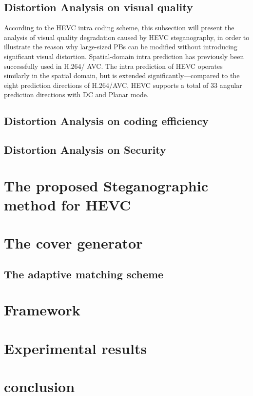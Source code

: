 \documentclass[journal,sort]{IEEEtran}
\begin{document}
\subsection{Distortion Analysis on visual quality}
According to the HEVC intra coding scheme, this subsection will present the analysis of visual quality degradation caused by HEVC steganography, in order to illustrate the reason why large-sized PBs can be modified without introducing significant visual distortion.
Spatial-domain intra prediction has previously been successfully used in H.264/ AVC. The intra prediction of HEVC operates similarly in the spatial domain, but is extended significantly—compared to the eight prediction directions of H.264/AVC, HEVC supports a total of 33 angular prediction directions with DC and Planar mode.

\subsection{Distortion Analysis on coding efficiency}
\subsection{Distortion Analysis on Security}
\section{The proposed Steganographic method for HEVC}

\section{The cover generator}

\subsection{The adaptive matching scheme}
\section{Framework}



\section{Experimental results}
\section{conclusion}




	
	
	
	
	
	
	
\end{document}
